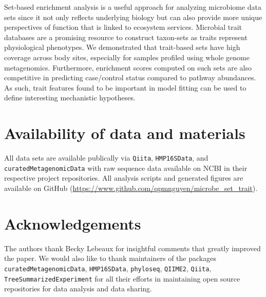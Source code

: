 Set-based enrichment analysis is a useful approach for analyzing microbiome data sets since it not only reflects underlying biology but can also provide more unique perspectives of function that is linked to ecosystem services. Microbial trait databases are a promising resource to construct taxon-sets as traits represent physiological phenotypes. We demonstrated that trait-based sets have high coverage across body sites, especially for samples profiled using whole genome metagenomics. Furthermore, enrichment scores computed on such sets are also competitive in predicting case/control status compared to pathway abundances. As such, trait features found to be important in model fitting can be used to define interesting mechanistic hypotheses. 



\section{Availability of data and materials}
All data sets are available publically via \texttt{Qiita}, \texttt{HMP16SData}, and \texttt{curatedMetagenomicData} with raw sequence data available on NCBI in their respective project repositories. All analysis scripts and generated figures are available on GitHub (\url{https://www.github.com/qpmnguyen/microbe_set_trait}). 

\section{Acknowledgements}
The authors thank Becky Lebeaux for insightful comments that greatly improved the paper. We would also like to thank maintainers of the packages \texttt{curatedMetagenomicData}, \texttt{HMP16SData}, \texttt{phyloseq}, \texttt{QIIME2}, \texttt{Qiita}, \texttt{TreeSummarizedExperiment} for all their efforts in maintaining open source repositories for data analysis and data sharing.  



